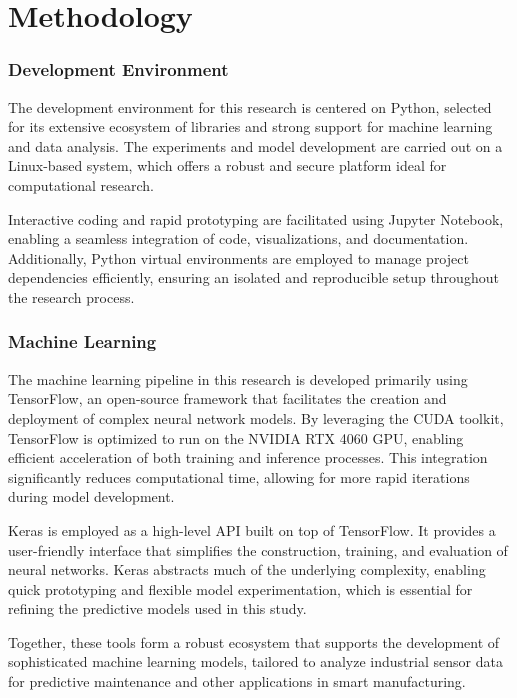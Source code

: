 \chapter{Methodology}
\label{chap:methodology}
\setlength{\parskip}{1em}

\subsection{Development Environment}

The development environment for this research is centered on Python, selected for its extensive ecosystem of libraries and strong support for machine learning and data analysis. The experiments and model development are carried out on a Linux-based system, which offers a robust and secure platform ideal for computational research.

Interactive coding and rapid prototyping are facilitated using Jupyter Notebook, enabling a seamless integration of code, visualizations, and documentation. Additionally, Python virtual environments are employed to manage project dependencies efficiently, ensuring an isolated and reproducible setup throughout the research process.

\subsection{Machine Learning}

The machine learning pipeline in this research is developed primarily using TensorFlow, an open-source framework that facilitates the creation and deployment of complex neural network models. By leveraging the CUDA toolkit, TensorFlow is optimized to run on the NVIDIA RTX 4060 GPU, enabling efficient acceleration of both training and inference processes. This integration significantly reduces computational time, allowing for more rapid iterations during model development.

Keras is employed as a high-level API built on top of TensorFlow. It provides a user-friendly interface that simplifies the construction, training, and evaluation of neural networks. Keras abstracts much of the underlying complexity, enabling quick prototyping and flexible model experimentation, which is essential for refining the predictive models used in this study.

Together, these tools form a robust ecosystem that supports the development of sophisticated machine learning models, tailored to analyze industrial sensor data for predictive maintenance and other applications in smart manufacturing.

